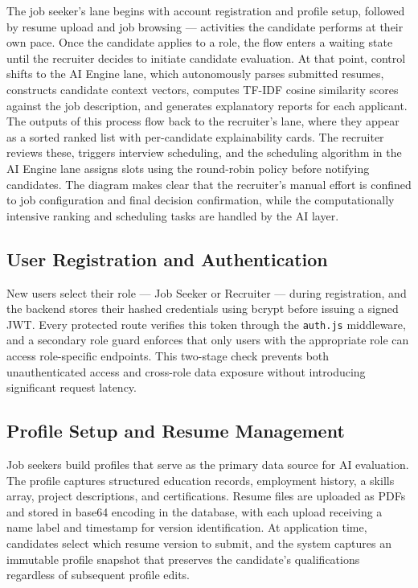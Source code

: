 \documentclass[12pt,a4paper]{report}
\begin{document}
The job seeker's lane begins with account registration and profile setup, followed by resume upload and job browsing — activities the candidate performs at their own pace. Once the candidate applies to a role, the flow enters a waiting state until the recruiter decides to initiate candidate evaluation. At that point, control shifts to the AI Engine lane, which autonomously parses submitted resumes, constructs candidate context vectors, computes TF-IDF cosine similarity scores against the job description, and generates explanatory reports for each applicant. The outputs of this process flow back to the recruiter's lane, where they appear as a sorted ranked list with per-candidate explainability cards. The recruiter reviews these, triggers interview scheduling, and the scheduling algorithm in the AI Engine lane assigns slots using the round-robin policy before notifying candidates. The diagram makes clear that the recruiter's manual effort is confined to job configuration and final decision confirmation, while the computationally intensive ranking and scheduling tasks are handled by the AI layer.

\subsection{User Registration and Authentication}

New users select their role — Job Seeker or Recruiter — during registration, and the backend stores their hashed credentials using bcrypt before issuing a signed JWT. Every protected route verifies this token through the \texttt{auth.js} middleware, and a secondary role guard enforces that only users with the appropriate role can access role-specific endpoints. This two-stage check prevents both unauthenticated access and cross-role data exposure without introducing significant request latency.

\subsection{Profile Setup and Resume Management}

Job seekers build profiles that serve as the primary data source for AI evaluation. The profile captures structured education records, employment history, a skills array, project descriptions, and certifications. Resume files are uploaded as PDFs and stored in base64 encoding in the database, with each upload receiving a name label and timestamp for version identification. At application time, candidates select which resume version to submit, and the system captures an immutable profile snapshot that preserves the candidate's qualifications regardless of subsequent profile edits.
\end{document}
